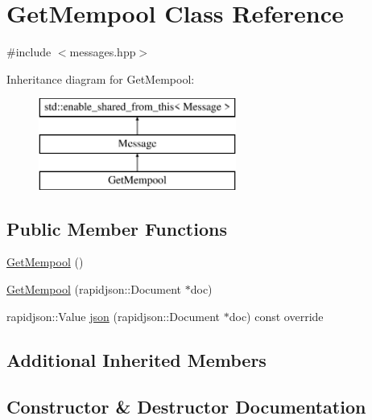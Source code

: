 \hypertarget{classGetMempool}{}\section{Get\+Mempool Class Reference}
\label{classGetMempool}


{\ttfamily \#include $<$messages.\+hpp$>$}

Inheritance diagram for Get\+Mempool\+:\begin{figure}[H]
\begin{center}
\leavevmode
\includegraphics[height=3.000000cm]{classGetMempool}
\end{center}
\end{figure}
\subsection*{Public Member Functions}
\begin{DoxyCompactItemize}
\item 
\mbox{\hyperlink{classGetMempool_a337115b4fa5609bd3d6ae8433382ab28}{Get\+Mempool}} ()
\item 
\mbox{\hyperlink{classGetMempool_a99f4e2b501cd290d13833116aa48e0f7}{Get\+Mempool}} (rapidjson\+::\+Document $\ast$doc)
\item 
rapidjson\+::\+Value \mbox{\hyperlink{classGetMempool_a3e6fb495c609ade4e8efd3d5668c28cf}{json}} (rapidjson\+::\+Document $\ast$doc) const override
\end{DoxyCompactItemize}
\subsection*{Additional Inherited Members}


\subsection{Constructor \& Destructor Documentation}
\mbox{\label{classGetMempool_a337115b4fa5609bd3d6ae8433382ab28}} 
